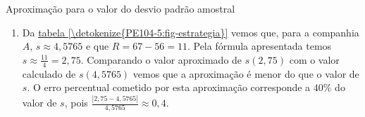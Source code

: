 {\begin{answer}{Aproximação para o valor do desvio padrão amostral}
{\begin{enumerate}
Da \hyperref[\detokenize{PE104-5:fig-summarymaratonamulheres}]{tabela \ref{\detokenize{PE104-5:fig-summarymaratonamulheres}}}, para a categoria mulheres, vemos que $s\approx11{,}13$ minutos e que $R=185{,}15-146{,}88=38{,}27$. Pela fórmula apresentada temos $s\approx38{,}274=9{,}57$ minutos. Comparando o valor aproximado de $s(9{,}57)$ com o valor calculado de $s(11{,}13)$ vemos que a aproximação é um pouco menor do que o valor de s. O erro percentual cometido por esta aproximação corresponde a cerca de $14\%$ do valor de $s$, pois $\frac{|9{,}57-11{,}13|}{11{,}13}\approx0,14$.

\item Da \hyperref[\detokenize{PE104-5:fig-estrategia}]{tabela \ref{\detokenize{PE104-5:fig-estrategia}}} vemos que, para a companhia $A$, $s\approx4{,}5765$ e que $R=67-56=11$. Pela fórmula apresentada temos $s\approx\frac{11}{4}=2{,}75$. Comparando o valor aproximado de $s(2{,}75)$ com o valor calculado de $s(4{,}5765)$ vemos que a aproximação é menor do que o valor de $s$. O erro percentual cometido por esta aproximação corresponde a $40\%$ do valor de $s$, pois $\frac{|2{,}75-4{,}5765|}{4{,}5765}\approx0{,}4$.


\end{enumerate}}
\end{answer}}
